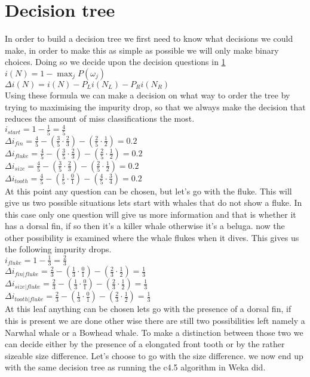 \documentclass[10pt,a4paper]{article}
\begin{document}
\section{Decision tree}
In order to build a decision tree we first need to know what decisions we could make, in order to make this as simple as possible we will only make binary choices. Doing so we decide upon the decision questions in \ref{}
$i \left ( N \right ) = 1 - \max _{j} P\left ( \omega _{j} \right )$\\
$\Delta i \left ( N \right ) = i \left ( N \right ) - P_{L}i\left ( N_{L} \right ) - P_{R}i\left ( N_{R} \right )$\\
Using these formula we can make a decision on what way to order the tree by trying to maximising the impurity drop, so that we always make the decision that reduces the amount of miss classifications the most.\\
$i_{start} = 1 - \frac{1}{5} = \frac{4}{5} $\\
$\Delta i_{fin} = \frac{4}{5} - \left ( \frac{3}{5}  \cdot \frac{2}{3} \right ) - \left ( \frac{2}{5} \cdot \frac{1}{2}\right ) = 0.2$\\
$\Delta i_{fluke} = \frac{4}{5} - \left ( \frac{3}{5}  \cdot \frac{2}{3} \right ) - \left ( \frac{2}{5} \cdot \frac{1}{2}\right ) = 0.2$\\
$\Delta i_{size} = \frac{4}{5} - \left ( \frac{3}{5}  \cdot \frac{2}{3} \right ) - \left ( \frac{2}{5} \cdot \frac{1}{2}\right ) = 0.2$\\
$\Delta i_{tooth} = \frac{4}{5} - \left ( \frac{1}{5}  \cdot \frac{0}{1} \right ) - \left ( \frac{4}{5} \cdot \frac{3}{4}\right ) = 0.2$\\
At this point any question can be chosen, but let’s go with the fluke.
This will give us two possible situations lets start with whales that do not show a fluke. In this case only one question will give us more information and that is whether it has a dorsal fin, if so then it's a killer whale otherwise it's a beluga.
now the other possibility is examined where the whale flukes when it dives. This gives us the following impurity drops.\\
$i_{fluke} = 1 - \frac{1}{3} = \frac{2}{3} $\\
$\Delta i_{fin|fluke} = \frac{2}{3} - \left ( \frac{1}{3}  \cdot \frac{0}{1} \right ) - \left ( \frac{2}{3} \cdot \frac{1}{2}\right ) = \frac{1}{3}$\\
$\Delta i_{size|fluke} = \frac{2}{3} - \left ( \frac{1}{3}  \cdot \frac{0}{1} \right ) - \left ( \frac{2}{3} \cdot \frac{1}{2}\right ) = \frac{1}{3}$\\
$\Delta i_{tooth|fluke} = \frac{2}{3} - \left ( \frac{1}{3}  \cdot \frac{0}{1} \right ) - \left ( \frac{2}{3} \cdot \frac{1}{2}\right ) = \frac{1}{3}$\\
At this leaf anything can be chosen lets go with the presence of a dorsal fin, if this is present we are done other wise there are still two possibilities left namely a Narwhal whale or a Bowhead whale. To make a distinction between those two we can decide either by the presence of a elongated front tooth or by the rather sizeable size difference. Let's choose to go with the size difference. we now end up with the same decision tree as running the c4.5 algorithm in Weka did.
\end{document}
